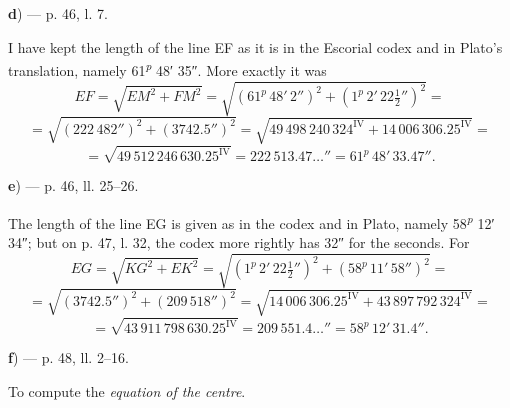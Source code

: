 \documentclass[11pt]{article}
\begin{document}
\par\begin{center}\textbf{d}) — p. 46, l. 7.\end{center}
\par I have kept the length of the line EF as it is in the Escorial codex and in Plato's translation, namely 61\textsuperscript{\itshape p} 48′ 35″. More exactly it was \[ EF = \sqrt{EM^2 + FM^2} = \sqrt{(61^{p}\,48'\,2'')^2 + (1^{p}\,2'\,22\tfrac{1}{2}'')^2} = \] \[ = \sqrt{(222\,482'')^2 + (3742.5'')^2} = \sqrt{49\,498\,240\,324^{\mathrm{IV}} + 14\,006\,306.25^{\mathrm{IV}}} = \] \[ = \sqrt{49\,512\,246\,630.25^{\mathrm{IV}}} = 222\,513.47\ldots'' = 61^{p}\,48'\,33.47''. \]\par
\par\begin{center}\textbf{e}) — p. 46, ll. 25–26.\end{center}
\par The length of the line EG is given as in the codex and in Plato, namely 58\textsuperscript{\itshape p} 12′ 34″; but on p. 47, l. 32, the codex more rightly has 32″ for the seconds. For \[ EG = \sqrt{KG^2 + EK^2} = \sqrt{(1^{p}\,2'\,22\tfrac{1}{2}'')^2 + (58^{p}\,11'\,58'')^2} = \] \[ = \sqrt{(3742.5'')^2 + (209\,518'')^2} = \sqrt{14\,006\,306.25^{\mathrm{IV}} + 43\,897\,792\,324^{\mathrm{IV}}} = \] \[ = \sqrt{43\,911\,798\,630.25^{\mathrm{IV}}} = 209\,551.4\ldots'' = 58^{p}\,12'\,31.4''. \]\par
\par\begin{center}\textbf{f}) — p. 48, ll. 2–16.\end{center}
\begin{center}\end{center}
\par To compute the \emph{equation of the centre}.\par
\end{document}
